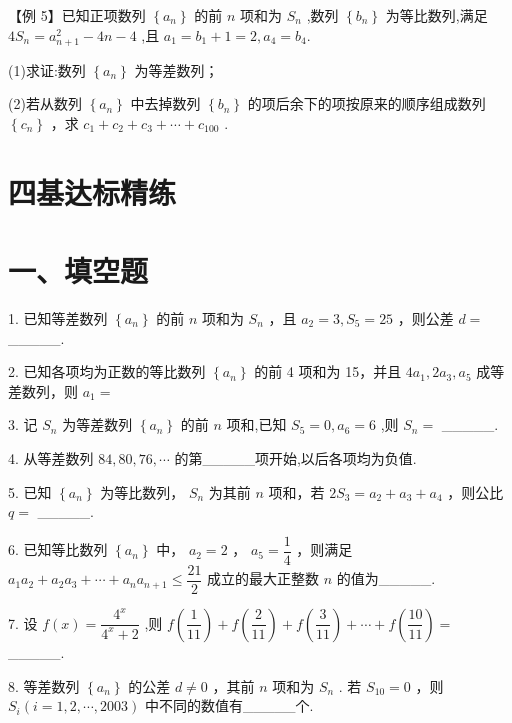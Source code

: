 【例 5】已知正项数列 $\left\{  {a}_{n}\right\}$ 的前 $n$ 项和为 ${S}_{n}$ ,数列 $\left\{  {b}_{n}\right\}$ 为等比数列,满足 $4{S}_{n} = {a}_{n + 1}^{2} - {4n} - 4$ ,且 ${a}_{1} =  {b}_{1} + 1 = 2,{a}_{4} = {b}_{4}.$

(1)求证:数列 $\left\{  {a}_{n}\right\}$ 为等差数列；

(2)若从数列 $\left\{  {a}_{n}\right\}$ 中去掉数列 $\left\{  {b}_{n}\right\}$ 的项后余下的项按原来的顺序组成数列 $\left\{  {c}_{n}\right\}$ ，求 ${c}_{1} + {c}_{2} + {c}_{3} + \cdots  + {c}_{100}$ .

\section*{四基达标精练}

\section*{一、填空题}

1. 已知等差数列 $\left\{  {a}_{n}\right\}$ 的前 $n$ 项和为 ${S}_{n}$ ，且 ${a}_{2} = 3,{S}_{5} = {25}$ ，则公差 $d =$ \_\_\_\_\_.

2. 已知各项均为正数的等比数列 $\left\{  {a}_{n}\right\}$ 的前 4 项和为 15，并且 $4{a}_{1},2{a}_{3},{a}_{5}$ 成等差数列，则 ${a}_{1}  =$

3. 记 ${S}_{n}$ 为等差数列 $\left\{  {a}_{n}\right\}$ 的前 $n$ 项和,已知 ${S}_{5} = 0,{a}_{6} = 6$ ,则 ${S}_{n} =$ \_\_\_\_\_.

4. 从等差数列 ${84},{80},{76},\cdots$ 的第\_\_\_\_\_项开始,以后各项均为负值.

5. 已知 $\left\{  {a}_{n}\right\}$ 为等比数列， ${S}_{n}$ 为其前 $n$ 项和，若 $2{S}_{3} = {a}_{2} + {a}_{3} + {a}_{4}$ ，则公比 $q =$ \_\_\_\_\_.

6. 已知等比数列 $\left\{  {a}_{n}\right\}$ 中， ${a}_{2} = 2$ ， ${a}_{5} = \dfrac{1}{4}$ ，则满足 ${a}_{1}{a}_{2} + {a}_{2}{a}_{3} + \cdots  + {a}_{n}{a}_{n + 1} \leq  \dfrac{21}{2}$ 成立的最大正整数 $n$ 的值为\_\_\_\_\_.

7. 设 $f\left( x\right)  = \dfrac{{4}^{x}}{{4}^{x} + 2}$ ,则 $f\left( \dfrac{1}{11}\right)  + f\left( \dfrac{2}{11}\right)  + f\left( \dfrac{3}{11}\right)  + \cdots  + f\left( \dfrac{10}{11}\right)  =$ \_\_\_\_\_.

8. 等差数列 $\left\{  {a}_{n}\right\}$ 的公差 $d \neq  0$ ，其前 $n$ 项和为 ${S}_{n}$ . 若 ${S}_{10} = 0$ ，则 ${S}_{i}\left( {i = 1,2,\cdots ,{2003}}\right)$ 中不同的数值有\_\_\_\_\_个.

